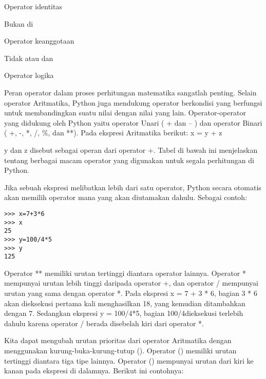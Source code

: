 Operator identitas \par
\vspace{12pt}
\noindent 
Bukan di \par
\noindent 
Operator keanggotaan \par
\vspace{12pt}
\noindent 
Tidak atau dan \par
\noindent 
Operator logika \par
\vspace{12pt}
\noindent 
Peran operator dalam proses perhitungan matematika sangatlah penting. Selain $  $operator Aritmatika, Python juga mendukung $  $operator berkondisi $  $yang berfungsi untuk membandingkan suatu nilai dengan nilai yang lain. Operator-operator yang didukung oleh Python yaitu $  $operator Unari $  $( + dan – ) dan $  $operator Binari $  $( +, -, *, /,  $  \%  $, dan **). Pada ekspresi Aritmatika berikut:\vspace{\baselineskip}
\vspace{\baselineskip}
x = y + z \par
\noindent 
y $  $dan $  $z $  $disebut sebagai operan dari operator $  $+. Tabel di bawah ini menjelaskan tentang berbagai macam operator yang digunakan untuk segala perhitungan di Python. \par
\vspace{12pt}
\noindent 
Jika sebuah ekspresi melibatkan lebih dari satu operator, Python secara otomatis akan memilih operator mana yang akan diutamakan dahulu. Sebagai contoh: \par
\begin{verbatim}
>>> x=7+3*6
>>> x
25
>>> y=100/4*5
>>> y
125

\end{verbatim}
Operator $  $** $  $memiliki urutan tertinggi diantara operator lainnya. Operator $  $* $  $mempunyai urutan lebih tinggi daripada operator $  $+, dan operator $  $/ $  $mempunyai urutan yang sama dengan operator $  $*. Pada ekspresi $  $x = 7 + 3 * 6, bagian $  $3 * 6 $  $akan dieksekusi pertama kali menghasilkan $  $18, yang kemudian ditambahkan dengan $  $7. Sedangkan ekspresi $  $y = 100/4*5, bagian $  $100/4dieksekusi terlebih dahulu karena operator $  $/ $  $berada disebelah kiri dari operator $  $*. \par
\vspace{12pt}
\noindent 
Kita dapat mengubah urutan prioritas dari operator Aritmatika dengan menggunakan kurung-buka-kurung-tutup $  $(). Operator $  $() $  $memiliki urutan tertinggi diantara tiga tipe lainnya. Operator $  $() $  $mempunyai urutan dari kiri ke kanan pada ekspresi di dalamnya. Berikut ini contohnya: \par
